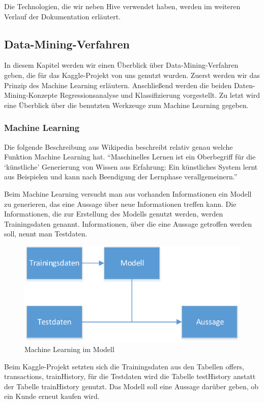 Die Technologien, die wir neben Hive verwendet haben, werden im weiteren Verlauf der Dokumentation erläutert.


\subsection{Data-Mining-Verfahren}
In diesem Kapitel werden wir einen Überblick über Data-Mining-Verfahren geben, die für das Kaggle-Projekt von uns genutzt wurden. Zuerst werden wir das Prinzip des Machine Learning erläutern. Anschließend werden die beiden Daten-Mining-Konzepte Regressionsanalyse und Klassifizierung vorgestellt. Zu letzt wird eine Überblick über die benutzten Werkzeuge zum Machine Learning gegeben.

\subsubsection{Machine Learning}
Die folgende Beschreibung aus Wikipedia beschreibt relativ genau welche Funktion Machine Learning hat. “Maschinelles Lernen ist ein Oberbegriff für die ‘künstliche’ Generierung von Wissen aus Erfahrung: Ein künstliches System lernt aus Beispielen und kann nach Beendigung der Lernphase verallgemeinern.”

Beim Machine Learning versucht man aus vorhanden Informationen ein Modell zu generieren, das eine Aussage über neue Informationen treffen kann. Die Informationen, die zur Erstellung des Modells genutzt werden, werden Trainingsdaten genannt. Informationen, über die eine Aussage getroffen werden soll, nennt man Testdaten.

\begin{figure}[H]
\centering
\includegraphics[width=0.9\linewidth]{Bilder/DataMining}
\caption{Machine Learning im Modell}
\label{fig:MachineLearning}
\end{figure}

Beim Kaggle-Projekt setzten sich die Trainingsdaten aus den Tabellen offers, transactions, trainHistory, für die Testdaten wird die Tabelle testHistory anstatt der Tabelle trainHistory genutzt. Das Modell soll eine Aussage darüber geben, ob ein Kunde erneut kaufen wird.

